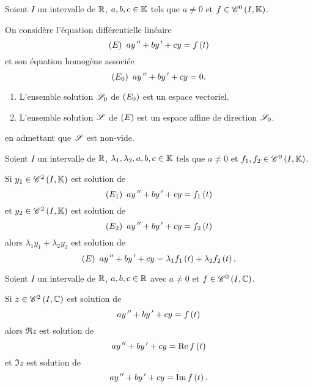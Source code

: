 \begin{prop}
Soient \(I\) un intervalle de \(\mathbb{R}\), \(a,b,c\in\mathbb{K}\) tels que \(a\not=0\) et \(f\in\mathscr{C}^{0}\left(I,\mathbb{K}\right)\).

On considère l'équation différentielle linéaire \[\left(E\right)~ay^{\,\prime\prime}+by^{\,\prime}+cy=f\left(t\right)\] et son équation homogène associée \[\left(E_0\right)~ay^{\,\prime\prime}+by^{\,\prime}+cy=0.\]

\begin{enumerate}
\item L'ensemble solution \(\mathscr{S}_0\) de \(\left(E_0\right)\) est un espace vectoriel. \\

\item L'ensemble solution \(\mathscr{S}\) de \(\left(E\right)\) est un espace affine de direction \(\mathscr{S}_0\).
\end{enumerate}
\end{prop}

\begin{dem}
\Cf {} en admettant que \(\mathscr{S}\) est non-vide.
\end{dem}

\begin{prop}
Soient \(I\) un intervalle de \(\mathbb{R}\), \(\lambda_1,\lambda_2,a,b,c\in\mathbb{K}\) tels que \(a\not=0\) et \(f_1,f_2\in\mathscr{C}^{0}\left(I,\mathbb{K}\right)\).

Si \(y_1\in\mathscr{C}^{2}\left(I,\mathbb{K}\right)\) est solution de \[\left(E_1\right)~ay^{\,\prime\prime}+by^{\,\prime}+cy=f_1\left(t\right)\] et \(y_2\in\mathscr{C}^{2}\left(I,\mathbb{K}\right)\) est solution de \[\left(E_2\right)~ay^{\,\prime\prime}+by^{\,\prime}+cy=f_2\left(t\right)\] alors \(\lambda_1y_1+\lambda_2y_2\) est solution de \[\left(E\right)~ay^{\,\prime\prime}+by^{\,\prime}+cy=\lambda_1f_1\left(t\right)+\lambda_2f_2\left(t\right).\]
\end{prop}

\begin{dem}
\end{dem}

\begin{prop}
Soient \(I\) un intervalle de \(\mathbb{R}\), \(a,b,c\in\mathbb{R}\) avec \(a\not=0\) et \(f\in\mathscr{C}^{0}\left(I,\mathbb{C}\right)\).

Si \(z\in\mathscr{C}^{2}\left(I,\mathbb{C}\right)\) est solution de \[ay^{\,\prime\prime}+by^{\,\prime}+cy=f\left(t\right)\] alors \(\Re z\) est solution de \[ay^{\,\prime\prime}+by^{\,\prime}+cy=\operatorname{Re} f\left(t\right)\] et \(\Im z\) est solution de \[ay^{\,\prime\prime}+by^{\,\prime}+cy=\operatorname{Im} f\left(t\right).\]
\end{prop}

